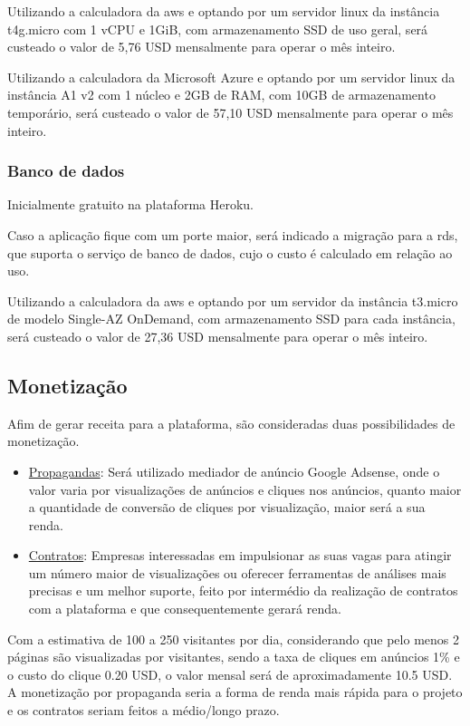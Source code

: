 Utilizando a calculadora da \gls{aws} e optando por um servidor \gls{linux} da instância
t4g.micro com 1 vCPU e 1GiB, com armazenamento SSD de uso geral, será
custeado o valor de 5,76 USD mensalmente para operar o mês inteiro.

Utilizando a calculadora da Microsoft Azure e optando por um servidor \gls{linux} da
instância A1 v2 com 1 núcleo e 2GB de RAM, com 10GB de armazenamento temporário, será 
custeado o valor de 57,10 USD mensalmente para operar o mês inteiro.

\subsubsection{Banco de dados}
Inicialmente gratuito na plataforma Heroku.

Caso a aplicação fique com um porte maior, será indicado a migração para a \gls{rds}, que suporta o serviço de banco de dados, cujo o custo é calculado em relação ao uso.

Utilizando a calculadora da \gls{aws} e optando por um servidor da instância t3.micro
de modelo Single-AZ OnDemand, com armazenamento SSD para cada instância,
será custeado o valor de 27,36 USD mensalmente para operar o mês inteiro.

\subsection{Monetização}
Afim de gerar receita para a plataforma, são consideradas duas possibilidades de monetização.

\begin{itemize}
    \item \underline{Propagandas}: Será utilizado mediador de anúncio Google Adsense, 
    onde o valor varia por visualizações de anúncios e cliques nos anúncios, quanto maior a quantidade de conversão
    de cliques por visualização, maior será a sua renda. 
    \item \underline{Contratos}: Empresas interessadas em impulsionar as suas vagas para atingir um número maior de visualizações ou 
    oferecer ferramentas de análises mais precisas e um melhor suporte, feito por intermédio da realização de contratos com a plataforma e 
    que consequentemente gerará renda.
\end{itemize}

Com a estimativa de 100 a 250 visitantes por dia, considerando que pelo menos 2 páginas são visualizadas por visitantes,
sendo a taxa de cliques em anúncios 1\% e o custo do clique 0.20 USD, o valor mensal será de aproximadamente 10.5 USD.
A monetização por propaganda seria a forma de renda mais rápida para o projeto e os contratos seriam feitos
a médio/longo prazo.

